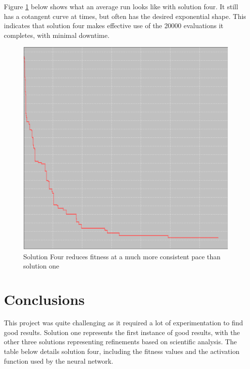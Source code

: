 \documentclass[sigconf]{acmart}
\begin{document}
Figure \ref{exponential} below shows what an average run looks like with solution four. It still has a cotangent curve at times, but often has the desired exponential shape. This indicates that solution four makes effective use of the 20000 evaluations it completes, with minimal downtime.

\begin{figure}[H]
\includegraphics[width=\columnwidth]{Exponential.png}
\caption[width=\columnwidth]{Solution Four reduces fitness at a much more consistent pace than solution one} \label{exponential}
\end{figure}

\section{Conclusions}
This project was quite challenging as it required a lot of experimentation to find good results. Solution one represents the first instance of good results, with the other three solutions representing refinements based on scientific analysis. The table below details solution four, including the fitness values and the activation function used by the neural network.
\end{document}
